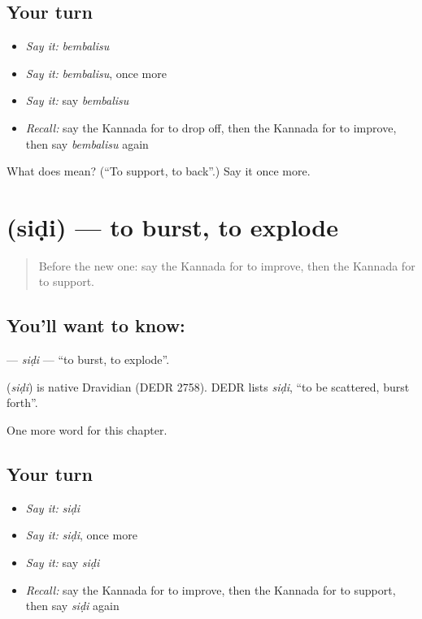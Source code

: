 \subsection*{Your turn}
\begin{itemize}
\raggedright
  \item \emph{Say it:} \emph{bembalisu}
  \item \emph{Say it:} \emph{bembalisu}, once more
  \item \emph{Say it:} say \emph{bembalisu}
  \item \emph{Recall:} say the Kannada for to drop off, then the Kannada for to improve, then say \emph{bembalisu} again
\end{itemize}

\begin{tcolorbox}[breakable,colback=teal!4,colframe=teal!35!black,title={Before you move on}]
What does  mean? (\textquotedblleft{}To support, to back\textquotedblright{}.) Say it once more.
\end{tcolorbox}
\section[\texorpdfstring{\kn{ಸಿಡಿ} (siḍi)}{ಸಿಡಿ (siḍi)}]{ (siḍi) — to burst, to explode}

\label{lesson:KA-C167-sidi}



\begin{quote}
Before the new one: say the Kannada for to improve, then the Kannada for to support.
\end{quote}

\subsection*{You'll want to know: }
\textbf{} — \emph{siḍi} — \textquotedblleft{}to burst, to explode\textquotedblright{}.

\begin{cousinweb}
\textbf{} (\emph{siḍi}) is native Dravidian (DEDR 2758). DEDR lists \emph{siḍi}, \textquotedblleft{}to be scattered, burst forth\textquotedblright{}.
\end{cousinweb}

\begin{grammarlens}[title={What you've built}]
One more word for this chapter.
\end{grammarlens}

\subsection*{Your turn}
\begin{itemize}
\raggedright
  \item \emph{Say it:} \emph{siḍi}
  \item \emph{Say it:} \emph{siḍi}, once more
  \item \emph{Say it:} say \emph{siḍi}
  \item \emph{Recall:} say the Kannada for to improve, then the Kannada for to support, then say \emph{siḍi} again
\end{itemize}

